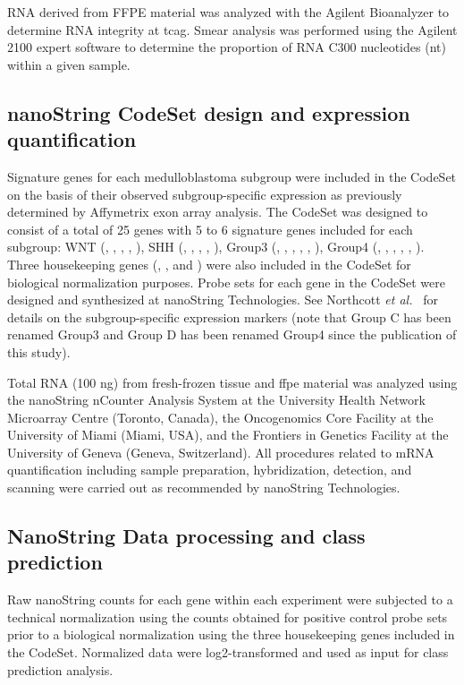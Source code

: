 RNA derived from FFPE material was analyzed with the Agilent Bioanalyzer to determine RNA integrity at \gls{tcag}. Smear analysis was performed using the Agilent 2100 expert software to determine the proportion of RNA C300 nucleotides (nt) within a given sample.

\subsection{nanoString CodeSet design and expression quantification}

Signature genes for each medulloblastoma subgroup were included in the CodeSet on the basis of their observed subgroup-specific expression as previously determined by Affymetrix exon array analysis.  The CodeSet was designed to consist of a total of 25 genes with 5 to 6 signature genes included for each subgroup: WNT (, , , , ), SHH (, , , , ), Group3 (, , , , , ), Group4 (, , , , , ).  Three housekeeping genes (, , and ) were also included in the CodeSet for biological normalization purposes.  Probe sets for each gene in the CodeSet were designed and synthesized at nanoString Technologies. See Northcott \emph{et al.}\  for details on the subgroup-specific expression markers (note that Group C has been renamed Group3 and Group D has been renamed Group4 since the publication of this study).

Total RNA (100 ng) from fresh-frozen tissue and \gls{ffpe} material was analyzed using the nanoString nCounter Analysis System at the University Health Network Microarray Centre (Toronto, Canada), the Oncogenomics Core Facility at the University of Miami (Miami, USA), and the Frontiers in Genetics Facility at the University of Geneva (Geneva, Switzerland).  All procedures related to mRNA quantification including sample preparation, hybridization, detection, and scanning were carried out as recommended by nanoString Technologies.

\subsection{NanoString Data processing and class prediction}

Raw nanoString counts for each gene within each experiment were subjected to a technical normalization using the counts obtained for positive control probe sets prior to a biological normalization using the three housekeeping genes included in the CodeSet.  Normalized data were log2-transformed and used as input for class prediction analysis.


